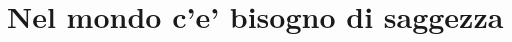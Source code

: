 \documentclass[11pt,twoside,final]{memoir}
\begin{document}
\chapter{Nel mondo c'e' bisogno di saggezza}



%
%
%
%


% 
% 
% 
% 
% 
% 
% 
% 

\cleartorecto
\thispagestyle{plain}


\emptysheet
\end{document}
